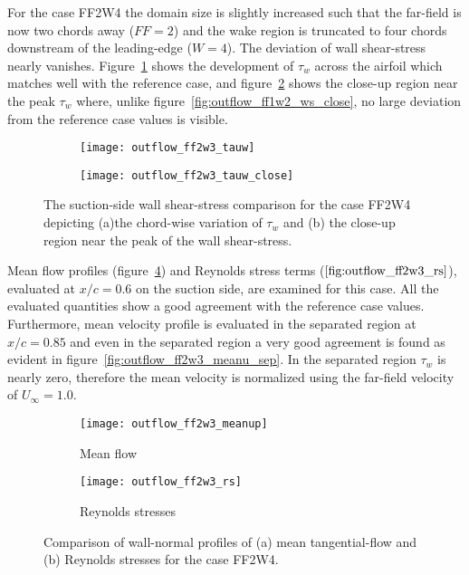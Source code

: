 For the case FF2W4 the domain size is slightly increased such that the far-field is now two chords away ($FF=2$) and the wake region is truncated to four chords downstream of the leading-edge ($W=4$). The deviation of wall shear-stress nearly vanishes. Figure~\ref{fig:outflow_ff2w3_ws} shows the development of $\tau_{w}$ across the airfoil which matches well with the reference case, and figure~\ref{fig:outflow_ff2w3_ws_close} shows the close-up region near the peak $\tau_{w}$ where, unlike figure~\ref{fig:outflow_ff1w2_ws_close}, no large deviation from the reference case values is visible.
\begin{figure}
	\centering
	\begin{subfigure}[h]{0.49\textwidth}
		\centering
		\caption{}		
		\texttt{[image: outflow\_ff2w3\_tauw]}
		\label{fig:outflow_ff2w3_ws}
	\end{subfigure}
	\begin{subfigure}[h]{0.49\textwidth}
		\centering
		\caption{}		
		\texttt{[image: outflow\_ff2w3\_tauw\_close]}
		\label{fig:outflow_ff2w3_ws_close}
	\end{subfigure}
	\caption{The suction-side wall shear-stress comparison for the case FF2W4 depicting (a)the  chord-wise variation of $\tau_{w}$ and (b) the close-up region near the peak of the wall shear-stress.}
	\label{fig:outflow_ff2w3}
\end{figure}
Mean flow profiles (figure~\ref{fig:outflow_ff2w3_up}) and Reynolds stress terms ($\ref{fig:outflow_ff2w3_rs}$), evaluated at $x/c=0.6$ on the suction side, are examined for this case. All the evaluated quantities show a good agreement with the reference case values. Furthermore, mean velocity profile is evaluated in the separated region at $x/c=0.85$ and even in the separated region a very good agreement is found as evident in figure~\ref{fig:outflow_ff2w3_meanu_sep}. In the separated region $\tau_{w}$ is nearly zero, therefore the mean velocity is normalized using the far-field velocity of $U_{\infty}=1.0$.
\begin{figure}
	\centering
	\begin{subfigure}[h]{0.49\textwidth}
		\centering
		\texttt{[image: outflow\_ff2w3\_meanup]}
		\caption{Mean flow}
		\label{fig:outflow_ff2w3_up}
	\end{subfigure}
	\begin{subfigure}[h]{0.49\textwidth}
		\centering
		\texttt{[image: outflow\_ff2w3\_rs]}
		\caption{Reynolds stresses}
		\label{fig:outflow_ff2w3_rs}
	\end{subfigure}
	\vspace{10pt}
	\caption{Comparison of wall-normal profiles of (a) mean tangential-flow and (b) Reynolds stresses for the case FF2W4.}
	\label{fig:outflow_ff2w3_u_rs}
\end{figure}
